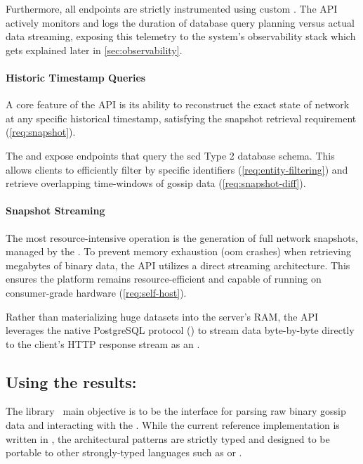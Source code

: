 Furthermore, all endpoints are strictly instrumented using custom . 
The API actively monitors and logs the duration of database query planning versus actual data streaming,
exposing this telemetry to the system's observability stack which gets explained later in \autoref{sec:observability}.

\paragraph{Historic Timestamp Queries}
A core feature of the API is its ability to reconstruct the exact state of network at any specific historical timestamp, 
satisfying the snapshot retrieval requirement (\ref{req:snapshot}).

The  and  expose endpoints that query the \gls{scd} Type 2 database schema. 
This allows clients to efficiently filter by specific identifiers (\ref{req:entity-filtering}) and 
retrieve overlapping time-windows of gossip data (\ref{req:snapshot-diff}).

\paragraph{Snapshot Streaming}
The most resource-intensive operation is the generation of full network snapshots, managed by the . 
To prevent memory exhaustion (\gls{oom} crashes) when retrieving megabytes of binary  data, the API utilizes a direct streaming architecture.
This ensures the platform remains resource-efficient and capable of running on consumer-grade hardware (\ref{req:self-host}).

Rather than materializing huge  datasets into the server's RAM, 
the API leverages the native PostgreSQL  protocol () 
to stream data byte-by-byte directly to the client's HTTP response stream as an . 


\subsection{Using the results: }
\label{sec:ln-history-python-client}

The  library~\cite{kraus_lnhistorypythonclient_2026} 
main objective is to be the interface for parsing raw binary gossip data and interacting with the .
While the current reference implementation is written in , the architectural patterns are strictly typed and designed to be portable
 to other strongly-typed languages such as  or .

